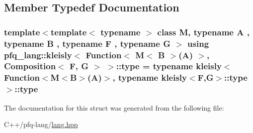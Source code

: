 \subsection{Member Typedef Documentation}
\hypertarget{structpfq__lang_1_1kleisly_3_01Function_3_01M_3_01B_01_4_07A_08_01_4_00_01Composition_3_01F_00_01G_01_4_01_4_a73a71a99f99e69b49591eaab1f358e18}{
\subsubsection[{type}]{\setlength{\rightskip}{0pt plus 5cm}template$<$template$<$ typename $>$ class M, typename A , typename B , typename F , typename G $>$ using {\bf pfq\+\_\+lang\+::kleisly}$<$ {\bf Function}$<$ M$<$ B $>$(A) $>$, {\bf Composition}$<$ F, G $>$ $>$\+::{\bf type} =  typename {\bf kleisly}$<$ {\bf Function}$<$M$<$B$>$(A)$>$, typename {\bf kleisly}$<$F,G$>$\+::{\bf type}$>$\+::{\bf type}}}\label{structpfq__lang_1_1kleisly_3_01Function_3_01M_3_01B_01_4_07A_08_01_4_00_01Composition_3_01F_00_01G_01_4_01_4_a73a71a99f99e69b49591eaab1f358e18}


The documentation for this struct was generated from the following file\+:\begin{DoxyCompactItemize}
\item 
C++/pfq-\/lang/\hyperlink{lang_8hpp}{lang.\+hpp}\end{DoxyCompactItemize}
